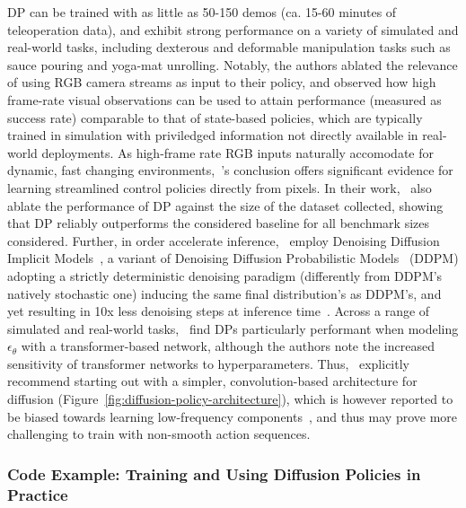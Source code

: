 DP can be trained with as little as 50-150 demos (ca. 15-60 minutes of teleoperation data), and exhibit strong performance on a variety of simulated and real-world tasks, including dexterous and deformable manipulation tasks such as sauce pouring and yoga-mat unrolling.
Notably, the authors ablated the relevance of using RGB camera streams as input to their policy, and observed how high frame-rate visual observations can be used to attain performance (measured as success rate) comparable to that of state-based policies, which are typically trained in simulation with priviledged information not directly available in real-world deployments.
As high-frame rate RGB inputs naturally accomodate for dynamic, fast changing environments,~\citet{chiDiffusionPolicyVisuomotor2024}'s conclusion offers significant evidence for learning streamlined control policies directly from pixels.
In their work,~\citet{chiDiffusionPolicyVisuomotor2024} also ablate the performance of DP against the size of the dataset collected, showing that DP reliably outperforms the considered baseline for all benchmark sizes considered.
Further, in order  accelerate inference,~\citet{chiDiffusionPolicyVisuomotor2024} employ Denoising Diffusion Implicit Models~\citep{songDenoisingDiffusionImplicit2022}, a variant of Denoising Diffusion Probabilistic Models~\citep{hoDenoisingDiffusionProbabilistic2020} (DDPM) adopting a strictly deterministic denoising paradigm (differently from DDPM's natively stochastic one) inducing the same final distribution's as DDPM's, and yet resulting in 10x less denoising steps at inference time~\citep{chiDiffusionPolicyVisuomotor2024}.
Across a range of simulated and real-world tasks,~\citet{chiDiffusionPolicyVisuomotor2024} find DPs particularly performant when modeling \( \epsilon_\theta \) with a transformer-based network, although the authors note the increased sensitivity of transformer networks to hyperparameters.
Thus,~\citet{chiDiffusionPolicyVisuomotor2024} explicitly recommend starting out with a simpler, convolution-based architecture for diffusion (Figure~\ref{fig:diffusion-policy-architecture}), which is however reported to be biased towards learning low-frequency components~\citep{tancikFourierFeaturesLet2020}, and thus may prove more challenging to train with non-smooth action sequences.


\subsubsection{Code Example: Training and Using Diffusion Policies in Practice}

